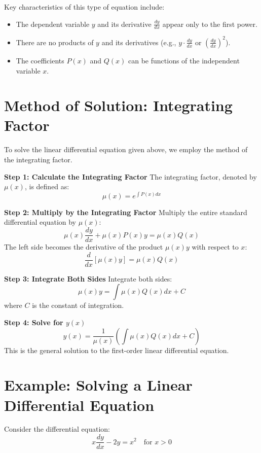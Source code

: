 \documentclass[12pt, letterpaper]{book}
\begin{document}
Key characteristics of this type of equation include:
\begin{itemize}
    \item The dependent variable $y$ and its derivative $\frac{dy}{dx}$ appear only to the first power.
    \item There are no products of $y$ and its derivatives (e.g., $y \cdot \frac{dy}{dx}$ or $(\frac{dy}{dx})^2$).
    \item The coefficients $P(x)$ and $Q(x)$ can be functions of the independent variable $x$.
\end{itemize}

\section{Method of Solution: Integrating Factor}
To solve the linear differential equation given above, we employ the method of the integrating factor.

\textbf{Step 1: Calculate the Integrating Factor}
The integrating factor, denoted by $\mu(x)$, is defined as:
\begin{equation*}
    \mu(x) = e^{\int P(x)dx}
\end{equation*}

\textbf{Step 2: Multiply by the Integrating Factor}
Multiply the entire standard differential equation by $\mu(x)$:
\begin{equation*}
    \mu(x)\frac{dy}{dx} + \mu(x)P(x)y = \mu(x)Q(x)
\end{equation*}
The left side becomes the derivative of the product $\mu(x)y$ with respect to $x$:
\begin{equation*}
    \frac{d}{dx}[\mu(x)y] = \mu(x)Q(x)
\end{equation*}

\textbf{Step 3: Integrate Both Sides}
Integrate both sides:
\begin{equation*}
    \mu(x)y = \int \mu(x)Q(x)dx + C
\end{equation*}
where $C$ is the constant of integration.

\textbf{Step 4: Solve for $y(x)$}
\begin{equation*}
    y(x) = \frac{1}{\mu(x)} \left( \int \mu(x)Q(x)dx + C \right)
\end{equation*}
This is the general solution to the first-order linear differential equation.

\section{Example: Solving a Linear Differential Equation}
Consider the differential equation:
\begin{equation*}
    x\frac{dy}{dx} - 2y = x^2 \quad \text{for } x > 0
\end{equation*}
\end{document}
